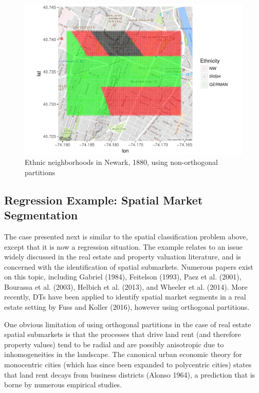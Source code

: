 \documentclass[]{elsarticle} %
\makeatletter
\def\maxwidth{\ifdim\Gin@nat@width>\linewidth\linewidth
\else\Gin@nat@width\fi}
\let\Oldincludegraphics\includegraphics
\renewcommand{\includegraphics}[1]{\Oldincludegraphics[width=\maxwidth]{#1}}
\makeatother
\begin{document}
\begin{figure}[htbp]
\centering
\includegraphics{Trees_with_Base_Functions_files/figure-latex/fig15-map-basis-newark-1.pdf}
\caption{\label{fig15-map-basis-newark}Ethnic neighborhoods in Newark,
1880, using non-orthogonal partitions}
\end{figure}

\subsection{Regression Example: Spatial Market
Segmentation}\label{regression-example-spatial-market-segmentation}

The case presented next is similar to the spatial classification problem
above, except that it is now a regression situation. The example relates
to an issue widely discussed in the real estate and property valuation
literature, and is concerned with the identification of spatial
submarkets. Numerous papers exist on this topic, including Gabriel
(1984), Feitelson (1993), Paez et al. (2001), Bourassa et al. (2003),
Helbich et al. (2013), and Wheeler et al. (2014). More recently, DTs
have been applied to identify spatial market segments in a real estate
setting by Fuss and Koller (2016), however using orthogonal partitions.

One obvious limitation of using orthogonal partitions in the case of
real estate spatial submarkets is that the processes that drive land
rent (and therefore property values) tend to be radial and are possibly
anisotropic due to inhomogeneities in the landscape. The canonical urban
economic theory for monocentric cities (which has since been expanded to
polycentric cities) states that land rent decays from business districts
(Alonso 1964), a prediction that is borne by numerous empirical studies.
\end{document}
